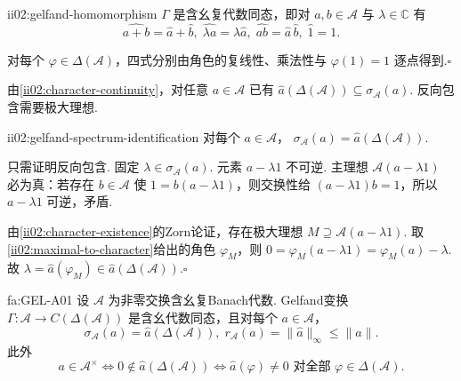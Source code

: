 \begin{FAProposition}[B][Gelfand变换的代数结构]{ii02:gelfand-homomorphism}
\(\displaystyle\Gamma\) 是含幺复代数同态，即对 \(\displaystyle a,b\in\mathcal A\) 与 \(\displaystyle\lambda\in\mathbb C\) 有
\[
\widehat{a+b}=\widehat a+\widehat b,
\;
\widehat{\lambda a}=\lambda\widehat a,
\;
\widehat{ab}=\widehat a\,\widehat b,
\;
\widehat1=1.
\]
\end{FAProposition}

\begin{FAProof}
对每个 \(\displaystyle\varphi\in\Delta(\mathcal A)\)，四式分别由角色的复线性、乘法性与 \(\displaystyle\varphi(1)=1\) 逐点得到.\hfill\(\square\)
\end{FAProof}

由\autoref{ii02:character-continuity}，对任意 \(\displaystyle a\in\mathcal A\) 已有
\(\displaystyle \widehat a(\Delta(\mathcal A)) \subseteq \sigma_{\mathcal A}(a).\)
反向包含需要极大理想.

\begin{FAProposition}[A][Gelfand谱识别]{ii02:gelfand-spectrum-identification}
对每个 \(\displaystyle a\in\mathcal A\)，
\(\displaystyle \sigma_{\mathcal A}(a) = \widehat a(\Delta(\mathcal A)).\)
\end{FAProposition}

\begin{FAProof}
只需证明反向包含. 固定 \(\displaystyle\lambda\in\sigma_{\mathcal A}(a)\). 元素 \(\displaystyle a-\lambda1\) 不可逆. 主理想 \(\displaystyle\mathcal A(a-\lambda1)\) 必为真：若存在 \(\displaystyle b\in\mathcal A\) 使 \(\displaystyle1=b(a-\lambda1)\)，则交换性给 \(\displaystyle(a-\lambda1)b=1\)，所以 \(\displaystyle a-\lambda1\) 可逆，矛盾.

由\autoref{ii02:character-existence}的Zorn论证，存在极大理想 \(\displaystyle M\supseteq\mathcal A(a-\lambda1)\). 取\autoref{ii02:maximal-to-character}给出的角色 \(\displaystyle\varphi_M\)，则
\(\displaystyle 0 =\varphi_M(a-\lambda1) =\varphi_M(a)-\lambda.\)
故 \(\displaystyle\lambda=\widehat a(\varphi_M)\in\widehat a(\Delta(\mathcal A))\).\hfill\(\square\)
\end{FAProof}

\begin{FATheorem}[A][Gelfand基本定理]{fa:GEL-A01}
设 \(\displaystyle\mathcal A\) 为非零交换含幺复Banach代数. Gelfand变换
\(\displaystyle \Gamma:\mathcal A\to C(\Delta(\mathcal A))\)
是含幺代数同态，且对每个 \(\displaystyle a\in\mathcal A\)，
\[
\sigma_{\mathcal A}(a)
=
\widehat a(\Delta(\mathcal A)),
\;
r_{\mathcal A}(a)
=
\|\widehat a\|_\infty
\leqslant
\|a\|.
\]
此外
\[
a\in\mathcal A^\times
\Longleftrightarrow
0\notin\widehat a(\Delta(\mathcal A))
\Longleftrightarrow
\widehat a(\varphi)\neq0
\text{ 对全部 }\varphi\in\Delta(\mathcal A).
\]
\end{FATheorem}


